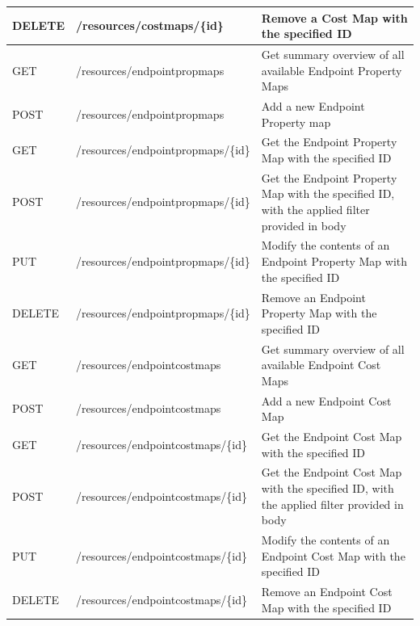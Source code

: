\begin{table}[]
{\begin{tabular}{|l|l|l|}
DELETE    & /resources/costmaps/\{id\}         & Remove a Cost Map with the specified ID                                                       \\ \hline
GET       & /resources/endpointpropmaps        & Get summary overview of all available Endpoint Property Maps                                  \\ \hline
POST      & /resources/endpointpropmaps        & Add a new Endpoint Property map                                                               \\ \hline
GET       & /resources/endpointpropmaps/\{id\} & Get the Endpoint Property Map with the specified ID                                           \\ \hline
POST      & /resources/endpointpropmaps/\{id\} & Get the Endpoint Property Map with the specified ID, with the applied filter provided in body \\ \hline
PUT       & /resources/endpointpropmaps/\{id\} & Modify the contents of an Endpoint Property Map with the specified ID                         \\ \hline
DELETE    & /resources/endpointpropmaps/\{id\} & Remove an Endpoint Property Map with the specified ID                                         \\ \hline
GET       & /resources/endpointcostmaps        & Get summary overview of all available Endpoint Cost Maps                                      \\ \hline
POST      & /resources/endpointcostmaps        & Add a new Endpoint Cost Map                                                                   \\ \hline
GET       & /resources/endpointcostmaps/\{id\} & Get the Endpoint Cost Map with the specified ID                                               \\ \hline
POST      & /resources/endpointcostmaps/\{id\} & Get the Endpoint Cost Map with the specified ID, with the applied filter provided in body     \\ \hline
PUT       & /resources/endpointcostmaps/\{id\} & Modify the contents of an Endpoint Cost Map with the specified ID                             \\ \hline
DELETE    & /resources/endpointcostmaps/\{id\} & Remove an Endpoint Cost Map with the specified ID                                             \\ \hline
\end{tabular}}
\label{table:alto-server-api}
\end{table}


